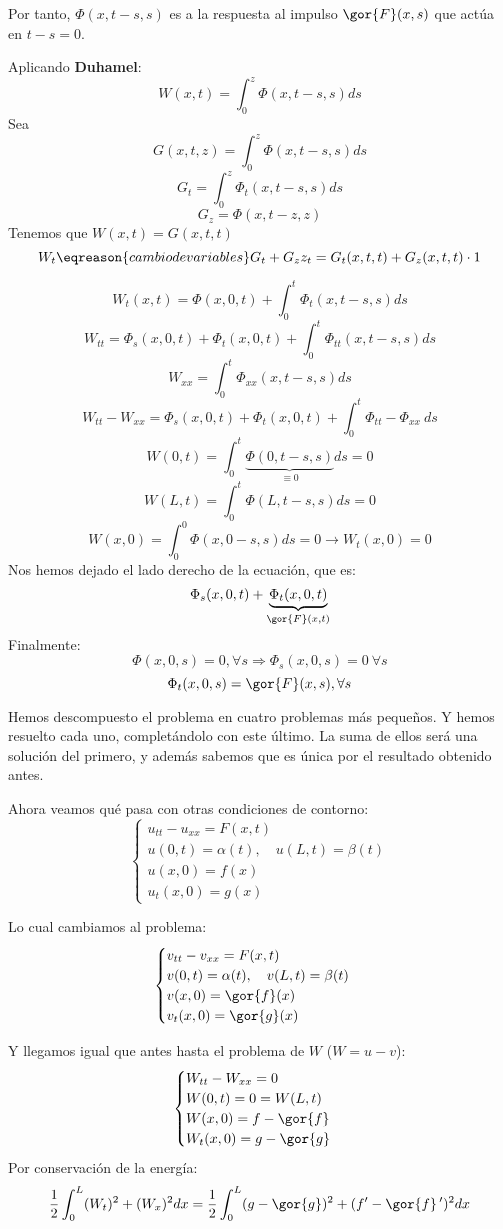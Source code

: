 			Por tanto, $\Phi(x,t-s,s)$ es a la respuesta al impulso $\gor{F} (x,s)$ que actúa en $t-s = 0$.

			Aplicando {\bf Duhamel}:
			\[ W(x,t) = \int_0^z \Phi(x,t-s,s) ds \]
			Sea
			\[ G(x,t,z) = \int_0^z \Phi(x,t-s,s) ds\]
			\[ G_t = \int_0^z \Phi_t (x,t-s,s) ds \]
			\[ G_z = \Phi(x,t-z,z) \]
			Tenemos que $W(x,t) = G(x,t,t)$
			\[ W_t \eqreason{cambio de variables} G_t + G_z z_t = G_t(x,t,t) + G_z (x,t,t) \cdot 1\]

			\[ W_t(x,t) = \Phi(x,0,t)+ \int_0^t \Phi_t (x,t-s,s) ds\]
			\[ W_{tt} = \Phi_{s} (x,0,t) + \Phi_t(x,0,t) + \int_0^t \Phi_{tt} (x,t-s,s) ds  \]
			\[ W_{xx} = \int_0^t \Phi_{xx} (x,t-s,s) ds \]
			\[ W_{tt} - W_{xx} = \Phi_{s}(x,0,t) + \Phi_t(x,0,t) + \int_0^t \Phi_{tt} - \Phi_{xx}\ ds \]
			\[ W(0,t) = \int_0^t \underbrace{\Phi(0,t-s,s)}_{\equiv 0} ds = 0  \]
			\[ W(L,t) = \int_0^t \Phi(L,t-s,s) ds = 0 \]
			\[ W(x,0) = \int_0^0 \Phi(x,0-s,s) ds = 0 \rightarrow W_t (x,0) = 0 \]
			Nos hemos dejado el lado derecho de la ecuación, que es:
			\[\Phi_s (x,0,t) + \underbrace{\Phi_t(x,0,t)}_{\gor{F}(x,t)} \]
			Finalmente:
			\[ \Phi(x,0,s) = 0, \forall s \Rightarrow \Phi_s (x,0,s) = 0 \ \forall s  \]
			\[ \Phi_t(x,0,s) = \gor{F}(x,s), \forall s \]

			Hemos descompuesto el problema en cuatro problemas más pequeños. Y hemos resuelto cada uno, completándolo con este último. La suma de ellos será una solución del primero, y además sabemos que es única por el resultado obtenido antes.

			Ahora veamos qué pasa con otras condiciones de contorno:
			\[ \begin{cases}
				u_{tt} - u_{xx} = F(x,t)\\
				u(0,t) = \alpha(t),\quad u(L,t) = \beta(t) \\
				u(x,0) = f(x) \\
				u_t(x,0) = g(x)
			\end{cases}\]

			Lo cual cambiamos al problema:
			\[ \begin{cases}
				v_{tt} - v_{xx} = F(x,t)\\
				v(0,t) = \alpha(t),\quad v(L,t) = \beta(t) \\
				v(x,0) = \gor{f}(x) \\
				v_t(x,0) = \gor{g}(x)
			\end{cases}\]

			Y llegamos igual que antes hasta el problema de $W$ ($W = u-v$):
			\[ \begin{cases}
				W_{tt} - W_{xx} = 0\\
				W(0,t) = 0 = W(L,t) \\
				W(x,0) = f - \gor{f} \\
				W_t(x,0) = g-  \gor{g}
			\end{cases}\]
			Por conservación de la energía:
			\[ \frac{1}{2} \int_0^L (W_t)^2 + (W_x)^2 dx = \frac{1}{2} \int_0^L (g-\gor{g})^2 + (f'-\gor{f}\,')^2 dx \]

